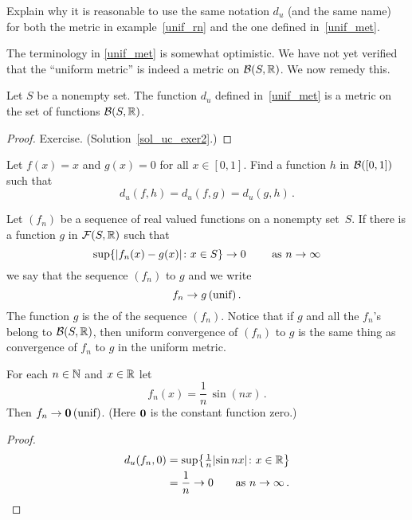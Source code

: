 \begin{prob} Explain why it is reasonable to use the same notation $d_u$ (and the same name)
for both the metric in example~\ref{unif_rn} and the one defined in~\ref{unif_met}.
\end{prob}

The terminology in \ref{unif_met} is somewhat optimistic. We have not yet verified that the
``uniform metric'' is indeed a metric on $\mathcal{B}(S,\mathbb{R})$. We now remedy this.

\begin{prop}\label{uc_exer2} Let $S$ be a nonempty set. The function $d_u$ defined
in~\ref{unif_met} is a metric on the set of functions $\mathcal{B}(S,\mathbb{R})$.
\end{prop}

\begin{proof} Exercise. (Solution~\ref{sol_uc_exer2}.)   \ns \end{proof}

\begin{prob} Let $f(x) = x$ and $g(x) = 0$ for all $x \in [0,1]$.  Find a function $h$ in
$\mathcal{B}([0,1])$ such that
  \[ d_u(f,h) = d_u(f,g) = d_u(g,h)\,. \]
\end{prob}

\begin{defn}\label{def_uc_R} Let $(f_n)$ be a sequence of real valued functions on a nonempty
set~$S$.  If there is a function $g$ in $\mathcal{F}(S,\mathbb{R})$ such that
  \[ \sup\{\lvert f_n(x) - g(x)\rvert \colon x \in S\} \rightarrow 0 \qquad \text{ as $n \rightarrow \infty$}\]
we say that the sequence $(f_n)$
 to $g$ and we write
   \[ f_n \rightarrow g \text{\,(unif)}\,. \]
The function $g$ is the
 of the sequence $(f_n)$. Notice that if $g$ and all the $f_n$'s belong to
$\mathcal{B}(S,\mathbb{R})$, then uniform convergence of $(f_n)$ to $g$ is the same thing as convergence of
$f_n$ to $g$ in the uniform metric.
\end{defn}

\begin{exam} For each $n \in \mathbb{N}$ and $x \in \mathbb{R}$ let
  \[ f_n(x) = \frac1n\,\sin(nx)\,. \]
Then $f_n \rightarrow \mathbf{0} \text{\,(unif)}$. (Here $\mathbf{0}$ is the constant function zero.)
\end{exam}

\begin{proof}
  \begin{align*}
     d_u(f_n,0) &= \sup\bigl\{\tfrac1n \lvert\sin nx\rvert \colon x\in \mathbb{R}\bigr\} \\
                &= \frac1n \rightarrow 0 \qquad\text{as $n \rightarrow \infty$}\,.   \qedhere
  \end{align*}
\end{proof}

